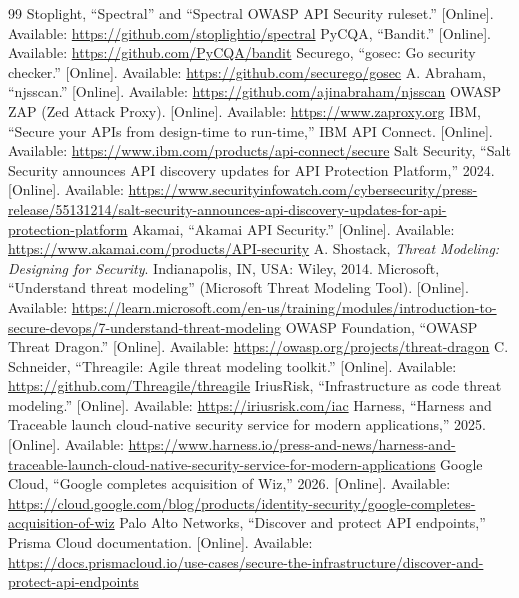 \documentclass[conference]{IEEEtran}
\begin{document}
\begin{thebibliography}{99}
 Stoplight, ``Spectral'' and ``Spectral OWASP API Security ruleset.'' [Online]. Available: \url{https://github.com/stoplightio/spectral}
 PyCQA, ``Bandit.'' [Online]. Available: \url{https://github.com/PyCQA/bandit}
 Securego, ``gosec: Go security checker.'' [Online]. Available: \url{https://github.com/securego/gosec}
 A. Abraham, ``njsscan.'' [Online]. Available: \url{https://github.com/ajinabraham/njsscan}
 OWASP ZAP (Zed Attack Proxy). [Online]. Available: \url{https://www.zaproxy.org}
 IBM, ``Secure your APIs from design-time to run-time,'' IBM API Connect. [Online]. Available: \url{https://www.ibm.com/products/api-connect/secure}
 Salt Security, ``Salt Security announces API discovery updates for API Protection Platform,'' 2024. [Online]. Available: \url{https://www.securityinfowatch.com/cybersecurity/press-release/55131214/salt-security-announces-api-discovery-updates-for-api-protection-platform}
 Akamai, ``Akamai API Security.'' [Online]. Available: \url{https://www.akamai.com/products/API-security}
 A. Shostack, \textit{Threat Modeling: Designing for Security}. Indianapolis, IN, USA: Wiley, 2014.
 Microsoft, ``Understand threat modeling'' (Microsoft Threat Modeling Tool). [Online]. Available: \url{https://learn.microsoft.com/en-us/training/modules/introduction-to-secure-devops/7-understand-threat-modeling}
 OWASP Foundation, ``OWASP Threat Dragon.'' [Online]. Available: \url{https://owasp.org/projects/threat-dragon}
 C. Schneider, ``Threagile: Agile threat modeling toolkit.'' [Online]. Available: \url{https://github.com/Threagile/threagile}
 IriusRisk, ``Infrastructure as code threat modeling.'' [Online]. Available: \url{https://iriusrisk.com/iac}
 Harness, ``Harness and Traceable launch cloud-native security service for modern applications,'' 2025. [Online]. Available: \url{https://www.harness.io/press-and-news/harness-and-traceable-launch-cloud-native-security-service-for-modern-applications}
 Google Cloud, ``Google completes acquisition of Wiz,'' 2026. [Online]. Available: \url{https://cloud.google.com/blog/products/identity-security/google-completes-acquisition-of-wiz}
 Palo Alto Networks, ``Discover and protect API endpoints,'' Prisma Cloud documentation. [Online]. Available: \url{https://docs.prismacloud.io/use-cases/secure-the-infrastructure/discover-and-protect-api-endpoints}

\end{thebibliography}
\end{document}
